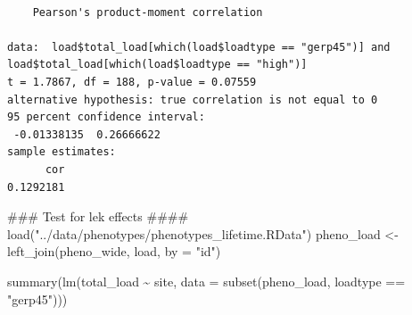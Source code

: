 \documentclass[
  letterpaper,
  DIV=11,
  numbers=noendperiod]{scrreprt}
\newenvironment{Shaded}{}{}
\newcommand{\AttributeTok}[1]{\textcolor[rgb]{0.84,0.23,0.29}{#1}}
\newcommand{\DocumentationTok}[1]{\textcolor[rgb]{0.42,0.45,0.49}{#1}}
\newcommand{\FunctionTok}[1]{\textcolor[rgb]{0.44,0.26,0.76}{#1}}
\newcommand{\NormalTok}[1]{\textcolor[rgb]{0.14,0.16,0.18}{#1}}
\newcommand{\OtherTok}[1]{\textcolor[rgb]{0.44,0.26,0.76}{#1}}
\newcommand{\SpecialCharTok}[1]{\textcolor[rgb]{0.00,0.36,0.77}{#1}}
\newcommand{\StringTok}[1]{\textcolor[rgb]{0.01,0.18,0.38}{#1}}
\begin{document}
\begin{Shaded}
\end{Shaded}

\begin{verbatim}

    Pearson's product-moment correlation

data:  load$total_load[which(load$loadtype == "gerp45")] and load$total_load[which(load$loadtype == "high")]
t = 1.7867, df = 188, p-value = 0.07559
alternative hypothesis: true correlation is not equal to 0
95 percent confidence interval:
 -0.01338135  0.26666622
sample estimates:
      cor 
0.1292181 
\end{verbatim}

\begin{Shaded}
\begin{Highlighting}[]
\DocumentationTok{\#\#\# Test for lek effects \#\#\#\#}
\FunctionTok{load}\NormalTok{(}\StringTok{"../data/phenotypes/phenotypes\_lifetime.RData"}\NormalTok{)}
\NormalTok{pheno\_load }\OtherTok{\textless{}{-}} \FunctionTok{left\_join}\NormalTok{(pheno\_wide, load, }\AttributeTok{by =} \StringTok{"id"}\NormalTok{)}

\FunctionTok{summary}\NormalTok{(}\FunctionTok{lm}\NormalTok{(total\_load }\SpecialCharTok{\textasciitilde{}}\NormalTok{ site, }\AttributeTok{data =} \FunctionTok{subset}\NormalTok{(pheno\_load, loadtype }\SpecialCharTok{==} \StringTok{"gerp45"}\NormalTok{)))}
\end{Highlighting}
\end{Shaded}
\end{document}
